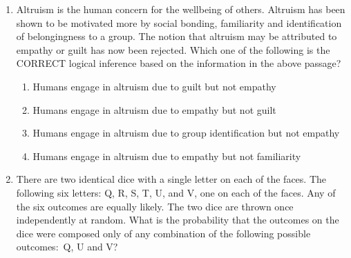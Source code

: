 \documentclass[journal,12pt,onecolumn]{IEEEtran}
\theoremstyle{remark}
\begin{document}
\begin{enumerate}
\begin{enumerate}
\end{enumerate}

\item Altruism is the human concern for the wellbeing of others. Altruism has been shown to be motivated more by social bonding, familiarity and identification of belongingness to a group. The notion that altruism may be attributed to empathy or guilt has now been rejected. Which one of the following is the CORRECT logical inference based on the information in the above passage?

\hfill{}

\begin{enumerate}
\item Humans engage in altruism due to guilt but not empathy
\item Humans engage in altruism due to empathy but not guilt
\item Humans engage in altruism due to group identification but not empathy
\item Humans engage in altruism due to empathy but not familiarity
\end{enumerate}
\item There are two identical dice with a single letter on each of the faces. The following six letters: Q, R, S, T, U, and V, one on each of the faces. Any of the six outcomes are equally likely. The two dice are thrown once independently at random. What is the probability that the outcomes on the dice were composed only of any combination of the following possible outcomes$\colon$ Q, U and V? 

\hfill{}

\begin{enumerate}
\end{enumerate}
\end{enumerate}
\end{document}

